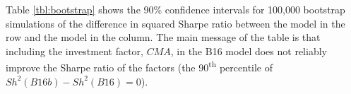 
Table \ref{tbl:bootstrap} shows the 90\% confidence intervals for 100,000 bootstrap
simulations of the difference in squared Sharpe ratio between the model in the row and the
model in the column. The main message of the table is that including the investment
factor, $CMA$, in the B16 model does not reliably improve the Sharpe ratio of the factors
(the 90\textsuperscript{th} percentile of $Sh^2(B16b)-Sh^2(B16)=0$).
